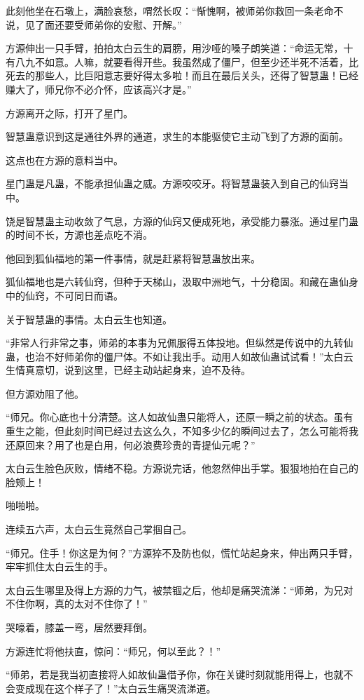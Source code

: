 \begin{this_body}
此刻他坐在石墩上，满脸哀愁，喟然长叹：“惭愧啊，被师弟你救回一条老命不说，见了面还要受师弟你的安慰、开解。”

方源伸出一只手臂，拍拍太白云生的肩膀，用沙哑的嗓子朗笑道：“命运无常，十有八九不如意。人嘛，就要看得开些。我虽然成了僵尸，但至少还半死不活着，比死去的那些人，比巨阳意志要好得太多啦！而且在最后关头，还得了智慧蛊！已经赚大了，师兄你不必介怀，应该高兴才是。”

方源离开之际，打开了星门。

智慧蛊意识到这是通往外界的通道，求生的本能驱使它主动飞到了方源的面前。

这点也在方源的意料当中。

星门蛊是凡蛊，不能承担仙蛊之威。方源咬咬牙。将智慧蛊装入到自己的仙窍当中。

饶是智慧蛊主动收敛了气息，方源的仙窍又便成死地，承受能力暴涨。通过星门蛊的时间不长，方源也差点吃不消。

他回到狐仙福地的第一件事情，就是赶紧将智慧蛊放出来。

狐仙福地也是六转仙窍，但种于天梯山，汲取中洲地气，十分稳固。和藏在蛊仙身中的仙窍，不可同日而语。

关于智慧蛊的事情。太白云生也知道。

“非常人行非常之事，师弟的本事为兄佩服得五体投地。但纵然是传说中的九转仙蛊，也治不好师弟你的僵尸体。不如让我出手。动用人如故仙蛊试试看！”太白云生情真意切，说到这里，已经主动站起身来，迫不及待。

但方源劝阻了他。

“师兄。你心底也十分清楚。这人如故仙蛊只能将人，还原一瞬之前的状态。虽有重生之能，但此刻时间已经过去这么久，不知多少亿的瞬间过去了，怎么可能将我还原回来？用了也是白用，何必浪费珍贵的青提仙元呢？”

太白云生脸色灰败，情绪不稳。方源说完话，他忽然伸出手掌。狠狠地拍在自己的脸颊上！

啪啪啪。

连续五六声，太白云生竟然自己掌掴自己。

“师兄。住手！你这是为何？”方源猝不及防也似，慌忙站起身来，伸出两只手臂，牢牢抓住太白云生的手。

太白云生哪里及得上方源的力气，被禁锢之后，他却是痛哭流涕：“师弟，为兄对不住你啊，真的太对不住你了！”

哭嚎着，膝盖一弯，居然要拜倒。

方源连忙将他扶直，惊问：“师兄，何以至此？！”

“师弟，若是我当初直接将人如故仙蛊借予你，你在关键时刻就能用得上，也就不会变成现在这个样子了！”太白云生痛哭流涕道。


\end{this_body}
